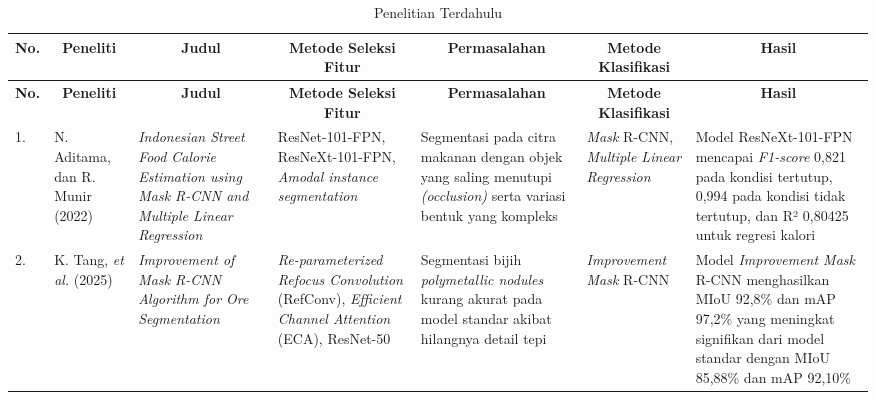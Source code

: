 \begin{landscape}
\begin{longtable}{|p{0.2cm}|p{1.6cm}|p{2.4cm}|p{2.5cm}|p{2.5cm}|p{2.5cm}|p{3.5cm}|}
	\caption{Penelitian Terdahulu}
	\label{table:2.Tinjauan}\\
	\hline
	\multicolumn{1}{|c|}{\textbf{No.}} & 
	\multicolumn{1}{c|}{\textbf{Peneliti}} & 
	\multicolumn{1}{c|}{\textbf{Judul}} & 
	\multicolumn{1}{c|}{\textbf{Metode Seleksi Fitur}} & 
	\multicolumn{1}{c|}{\textbf{Permasalahan}} & 
	\multicolumn{1}{c|}{\textbf{Metode Klasifikasi}} &
	\multicolumn{1}{c|}{\textbf{Hasil}} \\
	\hline
	\endfirsthead
	
	\hline
	\multicolumn{1}{|c|}{\textbf{No.}} & 
	\multicolumn{1}{c|}{\textbf{Peneliti}} & 
	\multicolumn{1}{c|}{\textbf{Judul}} & 
	\multicolumn{1}{c|}{\textbf{Metode Seleksi Fitur}} & 
	\multicolumn{1}{c|}{\textbf{Permasalahan}} & 
	\multicolumn{1}{c|}{\textbf{Metode Klasifikasi}} &
	\multicolumn{1}{c|}{\textbf{Hasil}} \\
	\hline
	\endhead
	
	\hline
	\endfoot
	
	\hline
	\endlastfoot
	
	1. & 
	N. Aditama, dan R. Munir (2022) \cite{FoodMaskRCNN10}& 
	\textit{Indonesian Street Food Calorie Estimation using Mask R-CNN and Multiple Linear Regression} & 
	ResNet-101-FPN, ResNeXt-101-FPN, \textit{Amodal instance segmentation} & 
	Segmentasi pada citra makanan dengan objek yang saling menutupi \textit{(occlusion)} serta variasi bentuk yang kompleks & 
	\textit{Mask} R-CNN, \textit{Multiple Linear Regression} & 
	Model ResNeXt-101-FPN mencapai \textit{F1-score} 0,821 pada kondisi tertutup, 0,994 pada kondisi tidak tertutup, dan R² 0,80425 untuk regresi kalori \\
	\hline
	
	2. & 
	K. Tang, \textit{et al.} (2025) \cite{OreSegmentation2}& 
	\textit{Improvement of Mask R-CNN Algorithm for Ore Segmentation} & 
	\textit{Re-parameterized Refocus Convolution} (RefConv), \textit{Efficient Channel Attention} (ECA), ResNet-50  & 
	Segmentasi bijih \textit{polymetallic nodules} kurang akurat pada model standar akibat hilangnya detail tepi & 
	\textit{Improvement Mask} R-CNN & 
	Model \textit{Improvement Mask} R-CNN menghasilkan MIoU 92,8\% dan mAP 97,2\% yang meningkat signifikan dari model standar dengan MIoU 85,88\% dan mAP 92,10\% \\
	\hline
	 

\end{longtable}
\end{landscape}
